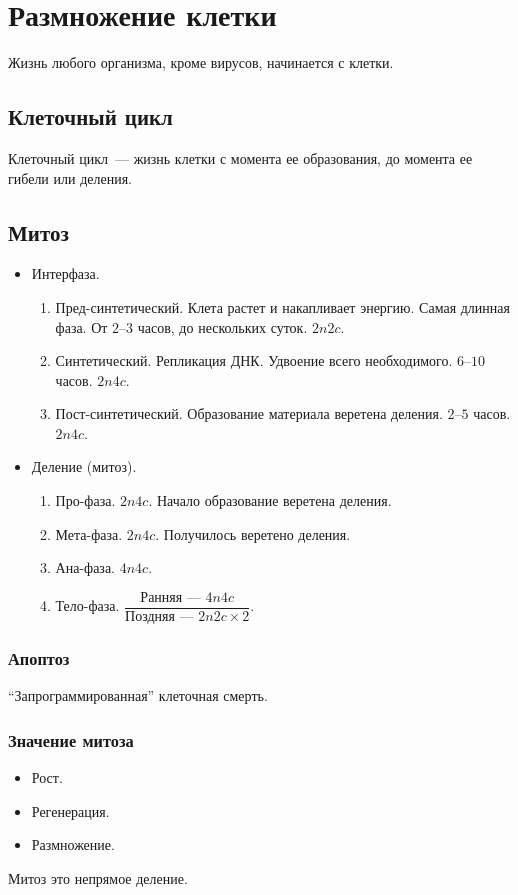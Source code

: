 \documentclass[12pt]{article}
\begin{document}
	\section{Размножение клетки}
	Жизнь любого организма, кроме вирусов, начинается с клетки.
	\subsection{Клеточный цикл}
	Клеточный цикл~--- жизнь клетки с момента ее образования, до момента ее гибели или деления.
	\subsection{Митоз}
	\begin{itemize}
		\item Интерфаза.
		\begin{enumerate}
			\item Пред-синтетический. Клета растет и накапливает энергию. Самая длинная фаза. От $2$--$3$ часов, до нескольких суток. $2n2c$.
			\item Синтетический. Репликация ДНК. Удвоение всего необходимого. $6$--$10$ часов. $2n4c$.
			\item Пост-синтетический. Образование материала веретена деления. $2$--$5$ часов. $2n4c$.
		\end{enumerate}
		\item Деление (митоз).
		\begin{enumerate}
			\item Про-фаза. $2n4c$. Начало образование веретена деления.
			\item Мета-фаза. $2n4c$. Получилось веретено деления.
			\item Ана-фаза. $4n4c$.
			\item Тело-фаза. $\dfrac{\text{Ранняя~--- } 4n4c}{\text{Поздняя~--- } 2n2c \times 2}$.
		\end{enumerate}
	\end{itemize}
	\subsubsection{Апоптоз}
	``Запрограммированная'' клеточная смерть.
	\subsubsection{Значение митоза}
	\begin{itemize}
		\item Рост.
		\item Регенерация.
		\item Размножение.
	\end{itemize}
	Митоз это непрямое деление.
\end{document}

